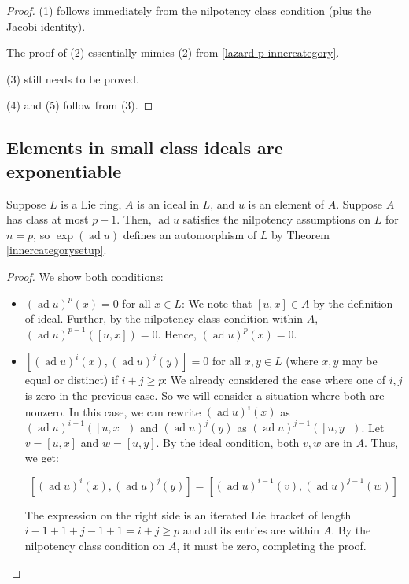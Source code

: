 \documentclass[10pt]{amsart}
\newcommand{\ad}{\operatorname{ad}}
\begin{document}
\begin{proof}
  (1) follows immediately from the nilpotency class condition (plus
      the Jacobi identity).

  The proof of (2) essentially mimics (2) from
  \ref{lazard-p-innercategory}.

  (3) still needs to be proved.

  (4) and (5) follow from (3).
\end{proof}

\subsection{Elements in small class ideals are exponentiable}

\begin{lemma}\label{small-class-ideal-exponentiable}
  Suppose $L$ is a Lie ring, $A$ is an ideal in $L$, and $u$ is an
  element of $A$. Suppose $A$ has class at most $p - 1$. Then, $\ad u$
  satisfies the nilpotency assumptions on $L$ for $n = p$, so
  $\exp(\ad u)$ defines an automorphism of $L$ by Theorem \ref{innercategorysetup}.
\end{lemma}

\begin{proof}
  We show both conditions:

  \begin{itemize}
  \item $(\ad u)^p(x) = 0$ for all $x \in L$: We note that $[u,x] \in
    A$ by the definition of ideal. Further, by the nilpotency class
    condition within $A$, $(\ad u)^{p-1}([u,x]) = 0$. Hence, $(\ad
    u)^p(x) = 0$.
  \item $[(\ad u)^i(x),(\ad u)^j(y)] = 0$ for all $x,y \in L$ (where
    $x,y$ may be equal or distinct) if $i + j \ge p$: We already
    considered the case where one of $i,j$ is zero in the previous
    case. So we will consider a situation where both are nonzero. In
    this case, we can rewrite $(\ad u)^i(x)$ as $(\ad u)^{i-1}([u,x])$
    and $(\ad u)^j(y)$ as $(\ad u)^{j-1}([u,y])$. Let $v = [u,x]$ and
    $w = [u,y]$. By the ideal condition, both $v,w$ are in $A$. Thus, we get:

    $$[(\ad u)^i(x),(\ad u)^j(y)] = [(\ad u)^{i-1}(v),(\ad u)^{j-1}(w)]$$

    The expression on the right side is an iterated Lie bracket of
    length $i - 1 + 1 + j - 1 + 1 = i + j \ge p$ and all its entries
    are within $A$. By the nilpotency class condition on $A$, it must
    be zero, completing the proof.
  \end{itemize}
\end{proof}
\end{document}
